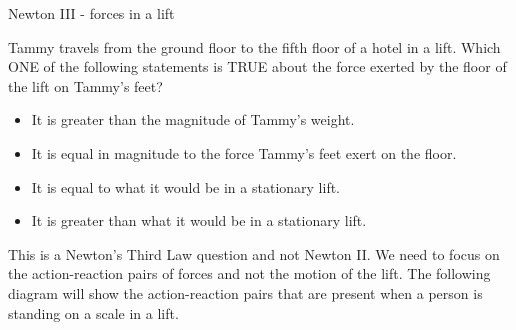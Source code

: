\begin{wex}{Newton III - forces in a lift}
{Tammy travels from the ground floor to the fifth floor of a hotel in a lift. Which ONE of the following statements is TRUE about the force exerted by the floor of the lift on Tammy's feet?
\begin{itemize}
\item[A] It is greater than the magnitude of Tammy's weight.
\item[B] It is equal in magnitude to the force Tammy's feet exert on the floor.
\item[C] It is equal to what it would be in  a stationary lift.
\item[D] It is greater than what it would be in a stationary lift.
\end{itemize}}
{
This is a Newton's Third Law question and not Newton II. We need to focus on the action-reaction pairs of forces and not the motion of the lift. The following diagram will show the action-reaction pairs that are present when a person is standing on a scale in a lift.

}
\end{wex}
